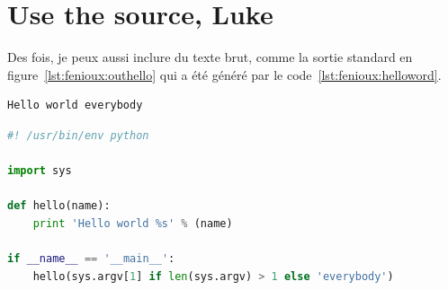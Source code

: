 \section{Use the source, Luke}


Des fois, je peux aussi inclure du texte brut, comme la sortie
standard en figure~\ref{lst:fenioux:outhello} qui a été généré par le
code~\ref{lst:fenioux:helloword}.

\begin{lstlisting}[language={},caption={Sortie standard},label={lst:fenioux:outhello}]
Hello world everybody
\end{lstlisting}

\begin{lstlisting}[language={Python},caption={Mon premier code},label={lst:fenioux:helloword}]
#! /usr/bin/env python

import sys

def hello(name):
    print 'Hello world %s' % (name)

if __name__ == '__main__':
    hello(sys.argv[1] if len(sys.argv) > 1 else 'everybody')
\end{lstlisting}



